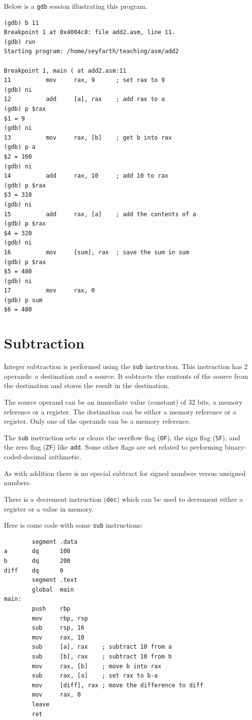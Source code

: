 \documentclass[11pt,b5paper]{book}
\begin{document}
Below is a {\tt gdb} session illustrating this program. 
\begin{verbatim}
(gdb) b 11
Breakpoint 1 at 0x4004c8: file add2.asm, line 11.
(gdb) run
Starting program: /home/seyfarth/teaching/asm/add2 

Breakpoint 1, main ( at add2.asm:11
11          mov     rax, 9      ; set rax to 9
(gdb) ni
12          add     [a], rax    ; add rax to a
(gdb) p $rax
$1 = 9
(gdb) ni
13          mov     rax, [b]    ; get b into rax
(gdb) p a
$2 = 160
(gdb) ni
14          add     rax, 10     ; add 10 to rax
(gdb) p $rax
$3 = 310
(gdb) ni
15          add     rax, [a]    ; add the contents of a
(gdb) p $rax
$4 = 320
(gdb) ni
16          mov     [sum], rax  ; save the sum in sum
(gdb) p $rax
$5 = 480
(gdb) ni
17          mov     rax, 0
(gdb) p sum
$6 = 480
\end{verbatim}

\section{Subtraction}

Integer subtraction is performed using the {\tt sub} instruction. 
This instruction has 2 operands: a destination and a source.
It subtracts the contents of the source from the destination and stores the
result in the destination.

The source operand can be an immediate value (constant) of 32 bits, a memory
reference or a register.
The destination can be either a memory reference or a register.
Only one of the operands can be a memory reference.

The {\tt sub} instruction sets or clears 
the overflow flag ({\tt OF}), 
the sign flag ({\tt SF}), 
and the zero flag ({\tt ZF}) like {\tt add}. 
Some other flags are set related to performing binary-coded-decimal
arithmetic.

As with addition there is no special subtract for signed numbers versus unsigned numbers.

There is a decrement instruction ({\tt dec}) which can be used to decrement 
either a register or a value in memory.

Here is come code with some {\tt sub} instructions:
\begin{verbatim}
        segment .data
a       dq      100
b       dq      200
diff    dq      0
        segment .text
        global  main
main:
        push    rbp
        mov     rbp, rsp
        sub     rsp, 16
        mov     rax, 10
        sub     [a], rax    ; subtract 10 from a
        sub     [b], rax    ; subtract 10 from b
        mov     rax, [b]    ; move b into rax
        sub     rax, [a]    ; set rax to b-a
        mov     [diff], rax ; move the difference to diff
        mov     rax, 0
        leave
        ret
\end{verbatim}
\end{document}
